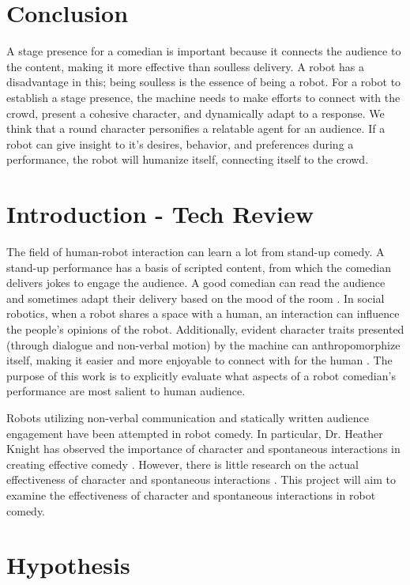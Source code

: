 \documentclass[onecolumn, draftclsnofoot,10pt, compsoc]{IEEEtran}
\begin{document}
\section{Conclusion}
A stage presence for a comedian is important because it connects the audience to the content, making it more effective than soulless delivery. A robot has a disadvantage in this; being soulless is the essence of being a robot. For a robot to establish a stage presence, the machine needs to make efforts to connect with the crowd, present a cohesive character, and dynamically adapt to a response. We think that a round character personifies a relatable agent for an audience. If a robot can give insight to it's desires, behavior, and preferences during a performance, the robot will humanize itself, connecting itself to the crowd.


\section{Introduction - Tech Review}
The field of human-robot interaction can learn a lot from stand-up comedy. A stand-up performance has a basis of scripted content, from which the comedian delivers jokes to engage the audience. A good comedian can read the audience and sometimes adapt their delivery based on the mood of the room \cite{talkingFunny}. In social robotics, when a robot shares a space with a human, an interaction can influence the people's opinions of the robot. Additionally, evident character traits presented (through dialogue and non-verbal motion) by the machine can anthropomorphize itself, making it easier and more enjoyable to connect with for the human \cite{KnightEightLessons:2011}. The purpose of this work is to explicitly evaluate what aspects of a robot comedian's performance are most salient to human audience.

Robots utilizing non-verbal communication and statically written audience engagement have been attempted in robot comedy. In particular, Dr. Heather Knight has observed the importance of character and spontaneous interactions in creating effective comedy \cite{KnightEightLessons:2011}. However, there is little research on the actual effectiveness of character and spontaneous interactions \cite{KatevasRobot:2014}. This project will aim to examine the effectiveness of character and spontaneous interactions in robot comedy.


\section{Hypothesis}
\end{document}
